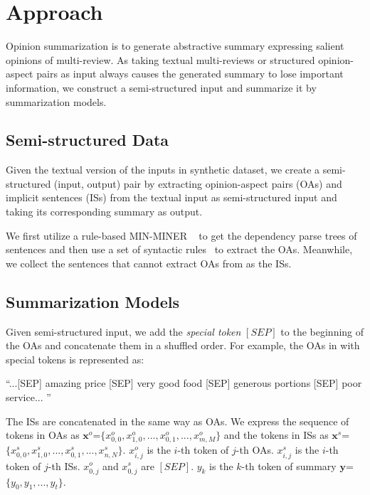 \section{Approach}
\label{sec:approach}
Opinion summarization is to generate abstractive 
summary expressing salient opinions of multi-review.
As taking textual multi-reviews or structured opinion-aspect pairs as input always causes the generated summary to lose important information,
we construct a semi-structured input and summarize it by summarization models.


\subsection{Semi-structured Data}
\label{sec:data}
Given the textual version of the inputs in synthetic dataset,
we create a semi-structured (input, output) pair
by extracting opinion-aspect pairs (OAs) and 
implicit sentences (ISs) from the textual input as semi-structured input and
taking its corresponding summary as output.

We first utilize a rule-based MIN-MINER ~\cite{basicOpiMin20} to get the dependency parse trees of sentences and then use a set of syntactic rules~\cite{aspect12} to extract the OAs.
Meanwhile, we collect the sentences that cannot extract OAs from as the ISs.


\subsection{Summarization Models}
\label{sec:model}
Given semi-structured input,
we add the {\em special token} $[SEP]$ to the beginning of the OAs and concatenate them in a shuffled order. 
For example, the OAs in  with special tokens is represented as:
\begin{example}
	\label{ex:exp}
	\small{``...[SEP] amazing price [SEP] very good food [SEP] generous portions [SEP] poor service... ''} 
\end{example}
The ISs are concatenated in the same way as OAs. 
We express the sequence of tokens in OAs as  $\textbf{x}^o$=$\{x^o_{0,0},x^o_{1,0},...,x^o_{0,1},...,x^o_{m,M}\}$
and the tokens in ISs as $\textbf{x}^s$=$\{x^s_{0,0},x^s_{1,0},...,x^s_{0,1},...,x^s_{n,N}\}$.
$x^o_{i,j}$ is the $i$-th token of $j$-th OAs.
$x^s_{i,j}$ is the $i$-th token of $j$-th ISs.
$x^o_{0,j}$ and $x^s_{0,j}$ are $[SEP]$.
$y_k$ is the $k$-th token of summary $\textbf{y}$=$\{y_0, y_1,..., y_t\}$.           


